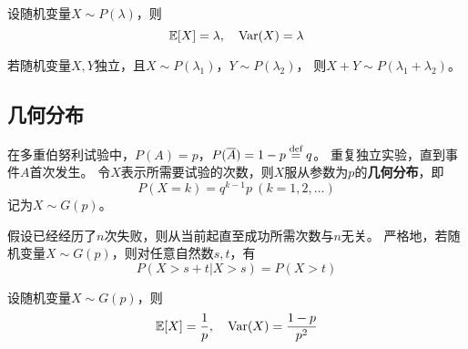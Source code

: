 \begin{theorem}[泊松分布的数字特征]
  设随机变量$X\sim P(\lambda)$，则
  \begin{displaymath}
    \mathbb{E}[X]=\lambda,\quad \textrm{Var}(X)=\lambda
  \end{displaymath}
\end{theorem}

\begin{theorem}[泊松分布的和]
  若随机变量$X,Y$独立，且$X\sim P(\lambda_1)$，$Y\sim P(\lambda_2)$，
  则$X+Y \sim P(\lambda_1+\lambda_2)$。
\end{theorem}

\subsection{几何分布}
\begin{definition}[几何分布]
  在多重伯努利试验中，$P(A)=p$，$P(\overline{A})=1-p\overset{\text{def}}{=} q$。
  重复独立实验，直到事件$A$首次发生。
  令$X$表示所需要试验的次数，则$X$服从参数为$p$的\textbf{几何分布}，即
  \begin{displaymath}
    P(X=k)=q^{k-1}p\ (k=1,2,\dots)
  \end{displaymath}
  记为$X\sim G(p)$。
\end{definition}

\begin{theorem}[几何分布的无记忆性]
  假设已经经历了$n$次失败，则从当前起直至成功所需次数与$n$无关。
  严格地，若随机变量$X\sim G(p)$，则对任意自然数$s,t$，有
  \begin{displaymath}
    P(X>s+t|X>s) = P(X>t)
  \end{displaymath}
\end{theorem}

\begin{theorem}[几何分布的数字特征]
  设随机变量$X\sim G(p)$，则
  \begin{displaymath}
    \mathbb{E}[X] = \frac{1}{p},\quad \textrm{Var}(X)=\frac{1-p}{p^2}
  \end{displaymath}
\end{theorem}
